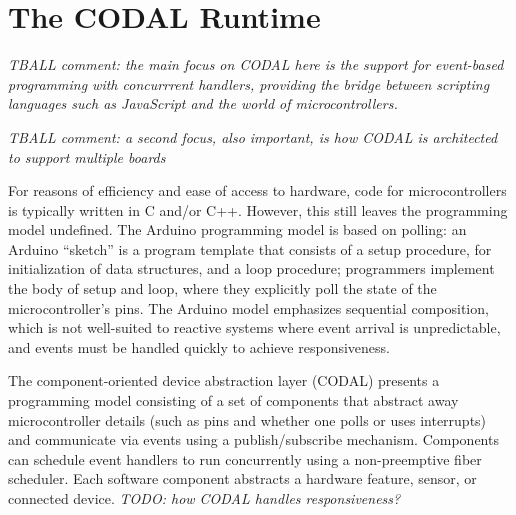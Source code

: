 \section{The CODAL Runtime}
\label{sec:codal}

\emph{TBALL comment: the main focus on CODAL here is the support for event-based programming with concurrrent handlers,
   providing the bridge between scripting languages such as JavaScript and the world of microcontrollers. }

\emph{TBALL comment: a second focus, also important, is how CODAL is architected to support multiple boards}

For reasons of efficiency and ease of access to hardware, code for microcontrollers is typically written in C and/or C++. 
However, this still leaves the programming model undefined. The Arduino programming model is based on polling: 
an Arduino ``sketch'' is a program template that consists of a setup procedure, for initialization of data structures,
and a loop procedure; programmers implement the body of setup and loop, where they explicitly poll the state of the
microcontroller’s pins. The Arduino model emphasizes sequential composition, which is not well-suited to reactive
systems where event arrival is unpredictable, and events must be handled quickly to achieve responsiveness.

The component-oriented device abstraction layer (CODAL) presents a programming model consisting of a set of
components that abstract away microcontroller details (such as pins and whether one polls or uses interrupts)
and communicate via events using a publish/subscribe mechanism.  Components can schedule event handlers to run
concurrently using a non-preemptive fiber scheduler. Each software component abstracts a hardware feature, sensor,
or connected device. \emph{TODO: how CODAL handles responsiveness?}

